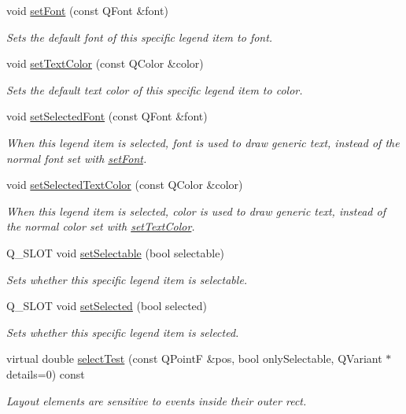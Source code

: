 \begin{DoxyCompactItemize}
\item 
void \hyperlink{classQCPAbstractLegendItem_a409c53455d8112f71d70c0c43eb10265}{set\+Font} (const Q\+Font \&font)
\begin{DoxyCompactList}\small\item\em Sets the default font of this specific legend item to {\itshape font}. \end{DoxyCompactList}\item 
void \hyperlink{classQCPAbstractLegendItem_a6ebace6aaffaedcdab2d74e88acc2d1e}{set\+Text\+Color} (const Q\+Color \&color)
\begin{DoxyCompactList}\small\item\em Sets the default text color of this specific legend item to {\itshape color}. \end{DoxyCompactList}\item 
void \hyperlink{classQCPAbstractLegendItem_a91db5aee48617a9d3206e61376807365}{set\+Selected\+Font} (const Q\+Font \&font)
\begin{DoxyCompactList}\small\item\em When this legend item is selected, {\itshape font} is used to draw generic text, instead of the normal font set with \hyperlink{classQCPAbstractLegendItem_a409c53455d8112f71d70c0c43eb10265}{set\+Font}. \end{DoxyCompactList}\item 
void \hyperlink{classQCPAbstractLegendItem_a4d01d008ee1a5bfe9905b0397a421936}{set\+Selected\+Text\+Color} (const Q\+Color \&color)
\begin{DoxyCompactList}\small\item\em When this legend item is selected, {\itshape color} is used to draw generic text, instead of the normal color set with \hyperlink{classQCPAbstractLegendItem_a6ebace6aaffaedcdab2d74e88acc2d1e}{set\+Text\+Color}. \end{DoxyCompactList}\item 
Q\+\_\+\+S\+L\+O\+T void \hyperlink{classQCPAbstractLegendItem_a9913ef48730551b696e7f98a2391c599}{set\+Selectable} (bool selectable)
\begin{DoxyCompactList}\small\item\em Sets whether this specific legend item is selectable. \end{DoxyCompactList}\item 
Q\+\_\+\+S\+L\+O\+T void \hyperlink{classQCPAbstractLegendItem_a6eed93b0ab99cb3eabb043fb08179c2b}{set\+Selected} (bool selected)
\begin{DoxyCompactList}\small\item\em Sets whether this specific legend item is selected. \end{DoxyCompactList}\item 
virtual double \hyperlink{classQCPAbstractLegendItem_ad0480d5cad34627a294a2921caa4a62f}{select\+Test} (const Q\+Point\+F \&pos, bool only\+Selectable, Q\+Variant $\ast$details=0) const 
\begin{DoxyCompactList}\small\item\em Layout elements are sensitive to events inside their outer rect. \end{DoxyCompactList}\end{DoxyCompactItemize}
